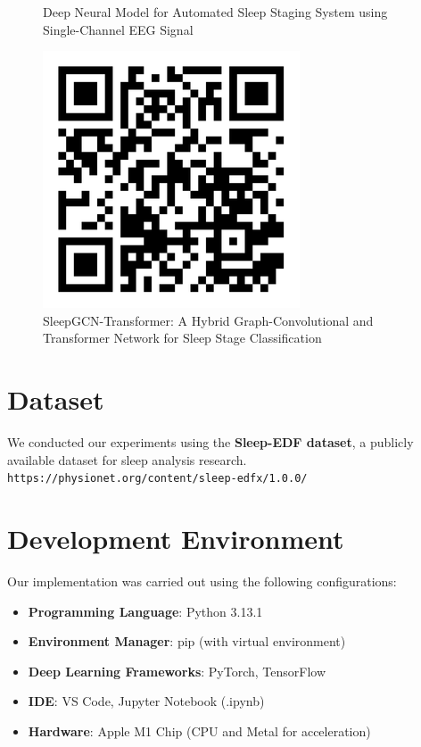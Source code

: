 \begin{figure}[h!]
\begin{minipage}[b]{0.3\linewidth}
		\caption{Deep Neural Model for Automated Sleep Staging System using Single-Channel EEG Signal}
		\label{fig:paper1}
	\end{minipage}\hfill
	\begin{minipage}[b]{0.3\linewidth}
		\centering
		\includegraphics[width=\linewidth]{img/paper2}
		\caption{SleepGCN-Transformer: A Hybrid Graph-Convolutional and Transformer Network for Sleep Stage Classification}
		\label{fig:paper2}
	\end{minipage}
\end{figure}

\section{Dataset}
We conducted our experiments using the \textbf{Sleep-EDF dataset}, a publicly available dataset for sleep analysis research.\\
\texttt{https://physionet.org/content/sleep-edfx/1.0.0/}

\section{Development Environment}
Our implementation was carried out using the following configurations:
\begin{itemize}
	\item \textbf{Programming Language}: Python 3.13.1
	\item \textbf{Environment Manager}: pip (with virtual environment)
	\item \textbf{Deep Learning Frameworks}: PyTorch, TensorFlow
	\item \textbf{IDE}: VS Code, Jupyter Notebook (.ipynb)
	\item \textbf{Hardware}: Apple M1 Chip (CPU and Metal for acceleration)
\end{itemize}


